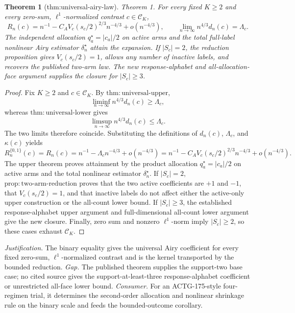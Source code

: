 \documentclass{article}
\newtheorem{theorem}{Theorem}
\begin{document}
\begin{theorem}[thm:universal-airy-law]\label{thm:universal-airy-law}
Theorem 1. For every fixed \(K\ge2\) and every zero-sum, \(\ell^1\)-normalized contrast \(c\in\mathcal C_K\),
\[
R_n(c)=n^{-1}-C_AV_c(s_c/2)^{2/3}n^{-4/3}+o(n^{-4/3}),
\qquad
\lim_{n\to\infty}n^{4/3}d_n(c)=\Lambda_c.
\]
The independent allocation \(q_a^\star=|c_a|/2\) on active arms and the total full-label nonlinear Airy estimator \(\delta_n^\star\) attain the expansion.  If \(|S_c|=2\), the reduction proposition gives \(V_c(s_c/2)=1\), allows any number of inactive labels, and recovers the published two-arm law.  The new response-alphabet and all-allocation-face argument supplies the closure for \(|S_c|\ge3\).
\end{theorem}
\begin{proof}
Fix \(K\ge2\) and \(c\in\mathcal C_K\).  By \(\mathrm{thm:universal\text{-}upper}\),
\[
\liminf_{n\to\infty}n^{4/3}d_n(c)\ge\Lambda_c,
\]
whereas \(\mathrm{thm:universal\text{-}lower}\) gives
\[
\limsup_{n\to\infty}n^{4/3}d_n(c)\le\Lambda_c.
\]
The two limits therefore coincide.  Substituting the definitions of \(d_n(c)\), \(\Lambda_c\), and \(\kappa(c)\) yields
\[
R_n^{\{0,1\}}(c)=R_n(c)
=n^{-1}-\Lambda_cn^{-4/3}+o(n^{-4/3})
=n^{-1}-C_AV_c(s_c/2)^{2/3}n^{-4/3}+o(n^{-4/3}).
\]
The upper theorem proves attainment by the product allocation \(q_a^\star=|c_a|/2\) on active arms and the total nonlinear estimator \(\delta_n^\star\).  If \(|S_c|=2\), \(\mathrm{prop:two\text{-}arm\text{-}reduction}\) proves that the two active coefficients are \(+1\) and \(-1\), that \(V_c(s_c/2)=1\), and that inactive labels do not affect either the active-only upper construction or the all-count lower bound.  If \(|S_c|\ge3\), the established response-alphabet upper argument and full-dimensional all-count lower argument give the new closure.  Finally, zero sum and nonzero \(\ell^1\)-norm imply \(|S_c|\ge2\), so these cases exhaust \(\mathcal C_K\).
\end{proof}
\par\smallskip\noindent \textit{Justification.} The binary equality gives the universal Airy coefficient for every fixed zero-sum, \(\ell^1\)-normalized contrast and is the kernel transported by the bounded reduction. \textit{Gap.} The published theorem supplies the support-two base case; no cited source gives the support-at-least-three response-alphabet coefficient or unrestricted all-face lower bound. \textit{Consumer.} For an ACTG-175-style four-regimen trial, it determines the second-order allocation and nonlinear shrinkage rule on the binary scale and feeds the bounded-outcome corollary.
\end{document}
